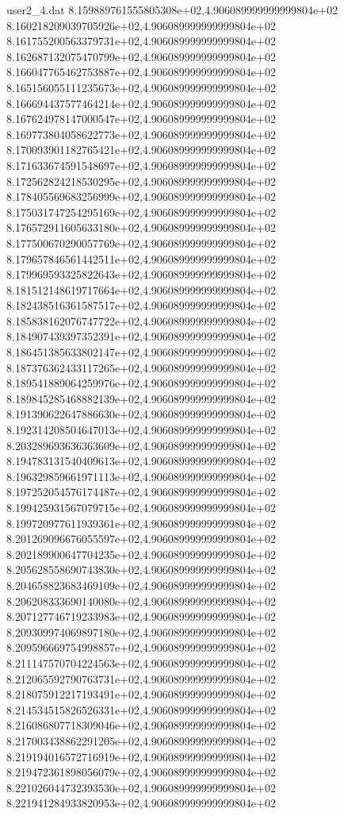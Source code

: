 \begin{filecontents}{user2_4.dat}
8.159889761555805308e+02,4.906089999999999804e+02
8.160218209039705926e+02,4.906089999999999804e+02
8.161755200563379731e+02,4.906089999999999804e+02
8.162687132075470799e+02,4.906089999999999804e+02
8.166047765462753887e+02,4.906089999999999804e+02
8.165156055111235673e+02,4.906089999999999804e+02
8.166694437577464214e+02,4.906089999999999804e+02
8.167624978147000547e+02,4.906089999999999804e+02
8.169773804058622773e+02,4.906089999999999804e+02
8.170093901182765421e+02,4.906089999999999804e+02
8.171633674591548697e+02,4.906089999999999804e+02
8.172562824218530295e+02,4.906089999999999804e+02
8.178405569683256999e+02,4.906089999999999804e+02
8.175031747254295169e+02,4.906089999999999804e+02
8.176572911605633180e+02,4.906089999999999804e+02
8.177500670290057769e+02,4.906089999999999804e+02
8.179657846561442511e+02,4.906089999999999804e+02
8.179969593325822643e+02,4.906089999999999804e+02
8.181512148619717664e+02,4.906089999999999804e+02
8.182438516361587517e+02,4.906089999999999804e+02
8.185838162076747722e+02,4.906089999999999804e+02
8.184907439397352391e+02,4.906089999999999804e+02
8.186451385633802147e+02,4.906089999999999804e+02
8.187376362433117265e+02,4.906089999999999804e+02
8.189541889064259976e+02,4.906089999999999804e+02
8.189845285468882139e+02,4.906089999999999804e+02
8.191390622647886630e+02,4.906089999999999804e+02
8.192314208504647013e+02,4.906089999999999804e+02
8.203289693636363609e+02,4.906089999999999804e+02
8.194783131540409613e+02,4.906089999999999804e+02
8.196329859661971113e+02,4.906089999999999804e+02
8.197252054576174487e+02,4.906089999999999804e+02
8.199425931567079715e+02,4.906089999999999804e+02
8.199720977611939361e+02,4.906089999999999804e+02
8.201269096676055597e+02,4.906089999999999804e+02
8.202189900647704235e+02,4.906089999999999804e+02
8.205628558690743830e+02,4.906089999999999804e+02
8.204658823683469109e+02,4.906089999999999804e+02
8.206208333690140080e+02,4.906089999999999804e+02
8.207127746719233983e+02,4.906089999999999804e+02
8.209309974069897180e+02,4.906089999999999804e+02
8.209596669754998857e+02,4.906089999999999804e+02
8.211147570704224563e+02,4.906089999999999804e+02
8.212065592790763731e+02,4.906089999999999804e+02
8.218075912217193491e+02,4.906089999999999804e+02
8.214534515826526331e+02,4.906089999999999804e+02
8.216086807718309046e+02,4.906089999999999804e+02
8.217003438862291205e+02,4.906089999999999804e+02
8.219194016572716919e+02,4.906089999999999804e+02
8.219472361898056079e+02,4.906089999999999804e+02
8.221026044732393530e+02,4.906089999999999804e+02
8.221941284933820953e+02,4.906089999999999804e+02

\end{filecontents}
